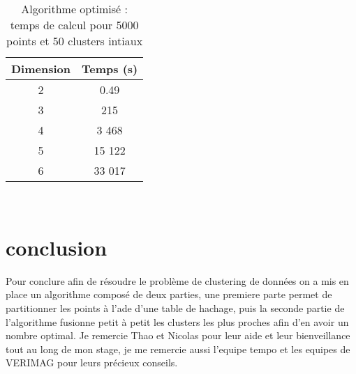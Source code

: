 \documentclass[a4paper,english,titlepage]{article}
\begin{document}
	\begin{table}[!ht]
		\center
		\begin{tabular}{|c|c|}
	  	\hline
	  	Dimension & Temps (s) \\
	    \hline
		  2 & 0.49 \\
		  3 & 215\\
		  4 & 3 468\\
		  5 & 15 122 \\
		  6 & 33 017\\
		\hline
		\end{tabular}	  
		\caption{Algorithme optimisé : temps de calcul pour 5000 points et 50 clusters intiaux}
	\end{table}
  	\clearpage
 	\newpage
 	\mbox{~}
 	\clearpage
 	\newpage


	\part{conclusion}
						
	Pour conclure afin de résoudre le problème de clustering de données on a mis en place un algorithme composé de deux parties, une premiere parte permet de partitionner les points à l'ade d'une table de hachage, puis la seconde partie de l'algorithme fusionne petit à petit les clusters les plus proches afin d'en avoir un nombre optimal.
	Je remercie Thao et Nicolas pour leur aide et leur bienveillance tout au long de mon stage, je me remercie aussi l'equipe tempo et les equipes de VERIMAG pour leurs précieux conseils.
	  
	  
\end{document}
